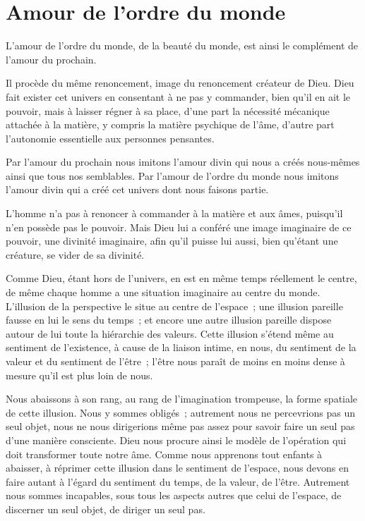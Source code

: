 \documentclass[french,twoside]{book} %
\begin{document}
\section[{Amour de l’ordre du monde}]{Amour de l’ordre du monde}
\noindent L'amour de l'ordre du monde, de la beauté du monde, est ainsi le complément de l'amour du prochain.\par
Il procède du même renoncement, image du renoncement créateur de Dieu. Dieu fait exister cet univers en consentant à ne pas y commander, bien qu'il en ait le pouvoir, mais à laisser régner à sa place, d'une part la nécessité mécanique attachée à la matière, y compris la matière psychique de l'âme, d'autre part l'autonomie essentielle aux personnes pensantes.\par
Par l'amour du prochain nous imitons l'amour divin qui nous a créés nous-mêmes ainsi que tous nos semblables. Par l'amour de l'ordre du monde nous imitons l'amour divin qui a créé cet univers dont nous faisons partie.\par
L'homme n'a pas à renoncer à commander à la matière et aux âmes, puisqu'il n'en possède pas le pouvoir. Mais Dieu lui a conféré une image imaginaire de ce pouvoir, une divinité imaginaire, afin qu'il puisse lui aussi, bien qu'étant une créature, se vider de sa divinité.\par
Comme Dieu, étant hors de l'univers, en est en même temps réellement le centre, de même chaque homme a une situation imaginaire au centre du monde. L'illusion de la perspective le situe au centre de l'espace ; une illusion pareille fausse en lui le sens du temps ; et encore une autre illusion pareille dispose autour de lui toute la hiérarchie des valeurs. Cette illusion s'étend même au sentiment de l'existence, à cause de la liaison intime, en nous, du sentiment de la valeur et du sentiment de l'être ; l'être nous paraît de moins en moins dense à mesure qu'il est plus loin de nous.\par
Nous abaissons à son rang, au rang de l'imagination trompeuse, la forme spatiale de cette illusion. Nous y sommes obligés ; autrement nous ne percevrions pas un seul objet, nous ne nous dirigerions même pas assez pour savoir faire un seul pas d'une manière consciente. Dieu nous procure ainsi le modèle de l'opération qui doit transformer toute notre âme. Comme nous apprenons tout enfants à abaisser, à réprimer cette illusion dans le sentiment de l'espace, nous devons en faire autant à l'égard du sentiment du temps, de la valeur, de l'être. Autrement nous sommes incapables, sous tous les aspects autres que celui de l'espace, de discerner un seul objet, de diriger un seul pas.\par
\end{document}
